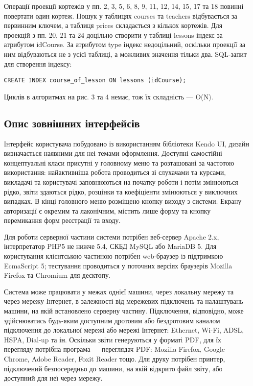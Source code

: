 Операції проекції кортежів у пп. 2, 3, 5, 6, 8, 9, 11, 12, 14, 15, 17 та 18 повинні повертати один кортеж. Пошук у таблицях courses та teachers відбувається за первинним ключем, а таблиця prices складається з кількох кортежів. Для проекцій з пп. 20, 21 та 24 доцільно створити у таблиці lessons індекс за атрибутом idCourse. За атрибутом type індекс недоцільний, оскільки проекції за ним відбуваються не з усієї таблиці, а можливих значення тільки два. SQL-запит для створення індексу:
\begin{verbatim}
CREATE INDEX course_of_lesson ON lessons (idCourse);
\end{verbatim}

Циклів в алгоритмах на рис. 3 та 4 немає, тож їх складність --- O(N).

\subsection{Опис зовнішних інтерфейсів}

Інтерфейс користувача побудовано із використанням бібліотеки Kendo UI, дизайн визначається наявними для неі темами оформлення. Доступні самостійні концептуальні класи присутні у головному меню та розташовані за частотою використання: найактивніша робота проводиться зі слухачами та курсами, викладачі та користувачі заповнюються на початку роботи і потім змінюються рідко, звіти здаються рідко, розцінки та коефіціенти змінюються у виключних випадках. В кінці головного меню розміщено кнопку виходу з системи. Екрану авторизації є окремим та лаконічним, містить лише форму та кнопку перемикання форм реєстрації та входу.

Для роботи серверної частини системи потрібен веб-сервер Apache 2.x, інтерпретатор PHP5 не нижче 5.4, СКБД MySQL або MariaDB 5. Для користування клієнтською частиною потрібен web-браузер із підтримкою EcmaScript 5; тестування проводиться у поточних версіях браузерів Mozilla Firefox та Chromium для десктопу.

Система може працювати у межах однієї машини, через локальну мережу та через мережу Інтернет, в залежності від мережевих підключень та налаштувань машини, на якій встановлено серверну частину. Підключення, відповідно, може здійснюватись будь-яким доступним дротовим або бездротовим каналом підключення до локальної мережі або мережі Інтернет: Ethernet, Wi-Fi, ADSL, HSPA, Dial-up та ін. Оскільки звіти генеруються у форматі PDF, для їх перегляду потрібна програма --- переглядач PDF: Mozilla Firefox, Google Chrome, Adobe Reader, Foxit Reader тощо. Для друку потрібен принтер, підключений безпосередньо до машини, на якій відкрито файл звіту, або доступний для неї через мережу.

